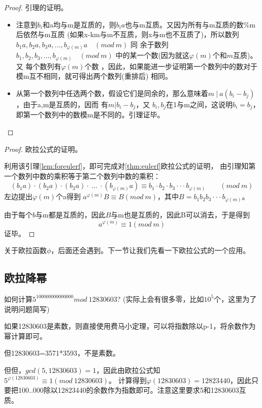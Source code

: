 \begin{proof}
引理的证明。
\begin{itemize}
	\item 注意到$b_i$和a均与m是互质的，则$b_ia$也与m互质。{\heiti 又因为所有与m互质的数\%m后依然与m互质} 
	(如果x-km与m不互质，则x与m也不互质了)，所以数列$b_1a,b_2a,b_3a,...,b_{\varphi(m)}a  \quad  (mod\ m)$ 同
	余于数列$b_1,b_2,b_3,...,b_{\varphi(m)} \quad (mod\ m)$ 中的某一个数(因为就这$\varphi(m)$个和$m$互质)。又
	每个数列有$\varphi(m)$个数 ，因此，如果能进一步证明第一个数列中的数对于模m互不相同，就可得出两个数列(重排后)
	相同。  
	\item 从第一个数列中任选两个数，假设它们是同余的，那么意味着$m\ |\ a(b_i-b_j)$，由于a,m是互质的，因而
	有$m|b_i-b_j$，又 $b_i ,b_j$在1与m之间，这说明$b_i=b_j$，即第一个数列中的数模m是不同的。引理证毕。
\end{itemize}
\end{proof}


\begin{proof}
欧拉公式的证明。

利用该引理\ref{lem:foreulerf}，即可完成对\ref{thm:eulerf}欧拉公式的证明，
由引理知第一个数列中数的乘积等于第二个数列中数的乘积：
$$
(b_1a)\cdot (b_2a)\cdot (b_3a)\cdot \ ...\ \cdot (b_{\varphi(m)}a) \equiv b_1\cdot b_2\cdot b_3 \cdot \cdot \cdot b_{\varphi(m)} \qquad  (mod\ m)
$$
左边提出$\varphi(m)$个a得到  $a^{\varphi(m)}B\equiv B (mod\ m)$，其中$B= b_1 b_2 b_3 \cdot \cdot \cdot b_{\varphi(m)} $。

由于每个$b$与m都是互质的，因此$B$与m也是互质的，因此B可以消去，于是得到
$$
a^{\varphi(m)}\equiv 1 (mod\ m)
$$
证毕。
\end{proof}

关于欧拉函数$\phi$，后面还会遇到。下一节让我们先看一下欧拉公式的一个应用。

\subsection{欧拉降幂}
如何计算$5^{100000000000000}mod\ 12830603$? (实际上会有很多零，比如$10^5$个，这里为了说明问题简写)

如果12830603是素数，则直接使用费马小定理，可以将指数除以p-1，将余数作为幂计算即可。

但12830603=3571*3593，不是素数。

但但，$gcd(5,12830603)=1$，因此由欧拉公式知$5^{\varphi(12830603)}\equiv 1 (mod \ 12830603)$。
计算得到$\varphi(12830603)=12823440$，因此只要把100..000除以12823440的余数作为指数即可。{\heiti 注意这里要求5和12830603互质}。

